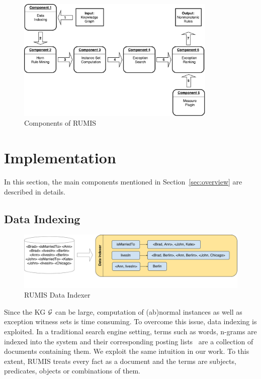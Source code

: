 \begin{figure}[ht]
\centering
\includegraphics[width=0.85\textwidth]{figures/system_overview}
\caption{Components of RUMIS}
\label{system_overview}
\end{figure}

\section{Implementation}

In this section, the main components mentioned in Section~\ref{sec:overview} are described in details.

\subsection{Data Indexing}
\label{data_indexing}

\begin{figure}[ht]
\centering
\includegraphics[width=1.0\textwidth]{figures/data_indexing}
\caption{RUMIS Data Indexer}
\label{data_indexing}
\end{figure}

Since the KG $\mathcal{G}$ can be large, computation of (ab)normal instances as well as exception witness sets is time consuming. To overcome this issue, data indexing is exploited. In a traditional search engine setting, terms such as words, n-grams are indexed into the system and their corresponding posting lists~\cite{ref47} are a collection of documents containing them. We exploit the same intuition in our work. To this extent, RUMIS treats every fact as a document and the terms are subjects, predicates, objects or combinations of them.

